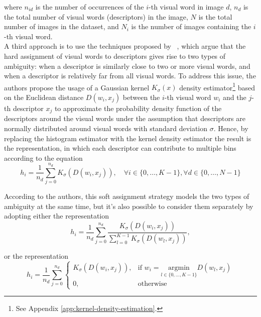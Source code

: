 \documentclass[../main.tex]{subfiles}
\begin{document}
where $n_{id}$ is the number of occurrences of the $i$-th visual word in image
$d$,
$n_{d}$ is the total number of visual words (descriptors) in the image,
$N$ is the total number of images in the dataset,
and $N_i$ is the number of images containing the $i$-th visual word.\\
A third approach is to use the  techniques proposed by
~\cite{gemert}, which argue that the hard assignment of
visual words to descriptors gives rise to two types of ambiguity:  when a descriptor is similarly close to two or more visual words,
and  when a descriptor is relatively far from all
visual words.
To address this issue, the authors propose the usage of a Gaussian kernel
$K_{\sigma}(x)$  density estimator\footnote{See Appendix
\ref{app:kernel-density-estimation}.} based on the Euclidean distance $D(w_i, x_j)$ between the $i$-th visual word $w_i$ and the $j$-th descriptor $x_j$ to approximate the probability density function of the descriptors around the visual words under the assumption that descriptors are normally distributed around visual words with 
standard deviation $\sigma$. Hence, by replacing the histogram estimator with
the kernel density estimator the result is the 
representation, in which each descriptor can contribute to multiple bins
according to the equation
\begin{equation}
	h_i = \frac{1}{n_{d}} \sum_{j=0}^{n_{d}} K_{\sigma}(D(w_i, x_j)),
	\quad
	\forall i \in \{0, \ldots, K-1\},
	\forall d \in \{0, \ldots, N-1\}
\end{equation}

According to the authors, this soft assignment strategy models the two types of
ambiguity at the same time, but it's also possible to consider them separately
by adopting either the  representation
\begin{equation}
	h_i = \frac{1}{n_{d}}
	\sum_{j=0}^{n_{d}} \frac{K_{\sigma}(D(w_i, x_j))}{\sum_{l=0}^{K-1}
	K_{\sigma}(D(w_l, x_j))},
\end{equation}

or the  representation
\begin{equation}
	h_i = \frac{1}{n_{d}}
	\sum_{j=0}^{n_{d}}
	\begin{cases}
		K_{\sigma}(D(w_i, x_j)), & \text{if } w_i = \underset{l \in \{0, \ldots, K-1\}}{\text{argmin}} D(w_l, x_j)\\
		0, & \text{otherwise}
	\end{cases}
\end{equation}
\end{document}

